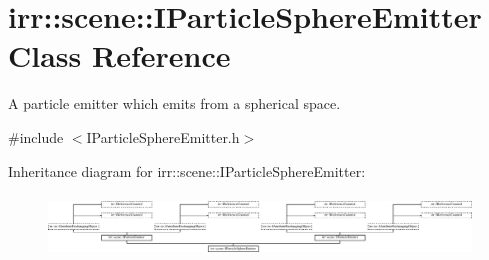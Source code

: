 \hypertarget{classirr_1_1scene_1_1IParticleSphereEmitter}{}\section{irr\+:\+:scene\+:\+:I\+Particle\+Sphere\+Emitter Class Reference}
\label{classirr_1_1scene_1_1IParticleSphereEmitter}


A particle emitter which emits from a spherical space.  




{\ttfamily \#include $<$I\+Particle\+Sphere\+Emitter.\+h$>$}

Inheritance diagram for irr\+:\+:scene\+:\+:I\+Particle\+Sphere\+Emitter\+:\begin{figure}[H]
\begin{center}
\leavevmode
\includegraphics[height=1.682692cm]{classirr_1_1scene_1_1IParticleSphereEmitter}
\end{center}
\end{figure}
